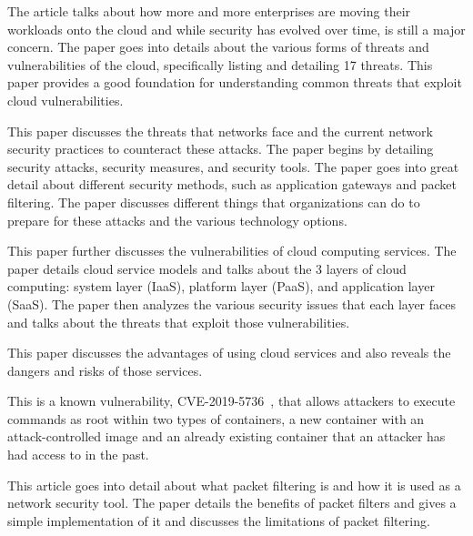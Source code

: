 \cite{ctv}
The article talks about how more and more enterprises are moving their workloads onto the cloud and while
security has evolved over time, is still a major concern. The paper goes into details about the various forms
of threats and vulnerabilities of the cloud, specifically listing and detailing 17 threats. This paper
provides a good foundation for understanding common threats that exploit cloud vulnerabilities.

\cite{mns}
This paper discusses the threats that networks face and the current network security practices to counteract these attacks.
The paper begins by detailing security attacks, security measures, and security tools. The paper goes into great detail about
different security methods, such as application gateways and packet filtering. The paper discusses different things that organizations
can do to prepare for these attacks and the various technology options.

\cite{stc}
This paper further discusses the vulnerabilities of cloud computing services. The paper details cloud service models and talks about
the 3 layers of cloud computing: system layer (IaaS), platform layer (PaaS), and application layer (SaaS). The paper then analyzes
the various security issues that each layer faces and talks about the threats that exploit those vulnerabilities.

\cite{cs}
This paper discusses the advantages of using cloud services and also reveals the dangers and risks of those services.

\cite{cve}
This is a known vulnerability, CVE-2019-5736~\cite{cve}, that allows attackers to execute commands as root within two types of containers,
a new container with an attack-controlled image and an already existing container that an attacker has had access to in the past.

\cite{tpf}
This article goes into detail about what packet filtering is and how it is used as a network security tool.
The paper details the benefits of packet filters and gives a simple implementation of it and discusses
the limitations of packet filtering.
